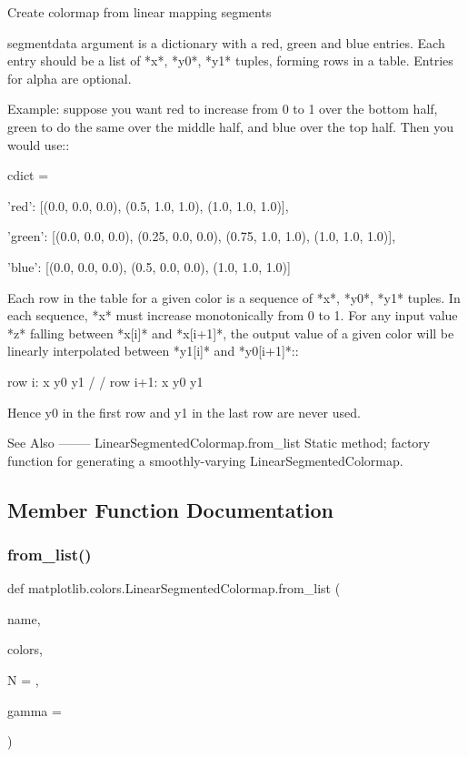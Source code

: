 \begin{DoxyVerb}Create colormap from linear mapping segments

segmentdata argument is a dictionary with a red, green and blue
entries. Each entry should be a list of *x*, *y0*, *y1* tuples,
forming rows in a table. Entries for alpha are optional.

Example: suppose you want red to increase from 0 to 1 over
the bottom half, green to do the same over the middle half,
and blue over the top half.  Then you would use::

    cdict = {'red':   [(0.0,  0.0, 0.0),
               (0.5,  1.0, 1.0),
               (1.0,  1.0, 1.0)],

     'green': [(0.0,  0.0, 0.0),
               (0.25, 0.0, 0.0),
               (0.75, 1.0, 1.0),
               (1.0,  1.0, 1.0)],

     'blue':  [(0.0,  0.0, 0.0),
               (0.5,  0.0, 0.0),
               (1.0,  1.0, 1.0)]}

Each row in the table for a given color is a sequence of
*x*, *y0*, *y1* tuples.  In each sequence, *x* must increase
monotonically from 0 to 1.  For any input value *z* falling
between *x[i]* and *x[i+1]*, the output value of a given color
will be linearly interpolated between *y1[i]* and *y0[i+1]*::

    row i:   x  y0  y1
           /
          /
    row i+1: x  y0  y1

Hence y0 in the first row and y1 in the last row are never used.

See Also
--------
LinearSegmentedColormap.from_list
    Static method; factory function for generating a smoothly-varying
    LinearSegmentedColormap.
\end{DoxyVerb}
 

\subsection{Member Function Documentation}
\mbox{\label{classmatplotlib_1_1colors_1_1LinearSegmentedColormap_abfffddd2eee0de3bdbd5f258536da399}} 
\subsubsection{\texorpdfstring{from\+\_\+list()}{from\_list()}}
{\footnotesize\ttfamily def matplotlib.\+colors.\+Linear\+Segmented\+Colormap.\+from\+\_\+list (\begin{DoxyParamCaption}\item[{}]{name,  }\item[{}]{colors,  }\item[{}]{N = {},  }\item[{}]{gamma = {} }\end{DoxyParamCaption})\hspace{0.3cm}{\ttfamily [static]}}

